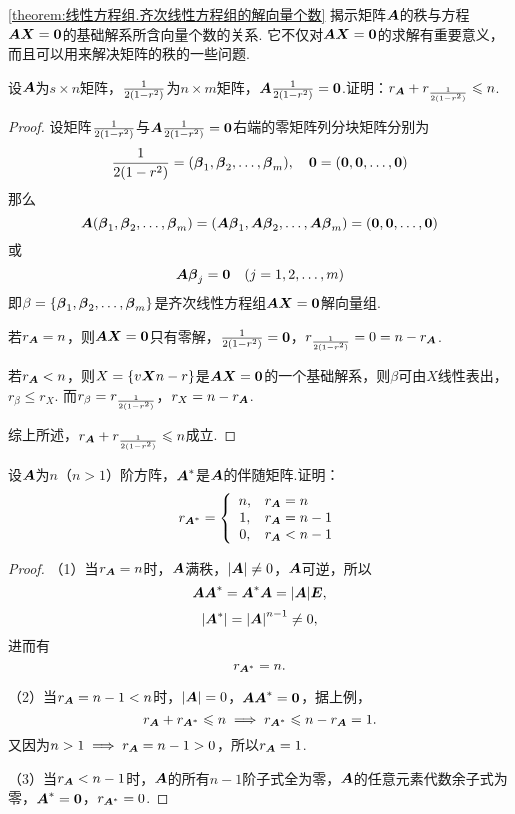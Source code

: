 \cref{theorem:线性方程组.齐次线性方程组的解向量个数} 揭示矩阵\(\A\)的秩与方程\(\A\x=\z\)的基础解系所含向量个数的关系.
它不仅对\(\A\x=\z\)的求解有重要意义，而且可以用来解决矩阵的秩的一些问题.
\begin{example}
设\(\A\)为\(s \times n\)矩阵，\(\B\)为\(n \times m\)矩阵，\(\A\B=\z\).证明：\(r_{\A} + r_{\B} \leqslant n\).
\begin{proof}
\def\b#1{\mat{\beta}_{#1}}
设矩阵\(\B\)与\(\A\B=\z\)右端的零矩阵列分块矩阵分别为\[
\B=(\b1,\b2,\dotsc,\b m),
\quad
\z=(\z,\z,\dotsc,\z)
\]那么\[
\A(\b1,\b2,\dotsc,\b m) = (\A\b1,\A\b2,\dotsc,\A\b m) = (\z,\z,\dotsc,\z)
\]或\[
\A\b j = \z \quad (j=1,2,\dotsc,m)
\]即\(\beta=\{\b1,\b2,\dotsc,\b m\}\)是齐次线性方程组\(\A\mat{X}=\z\)解向量组.

若\(r_{\A}=n\)，则\(\A\mat{X}=\z\)只有零解，\(\B=\z\)，\(r_{\B}=0=n-r_{\A}\).

若\(r_{\A}<n\)，则\(X=\{\v{\x}{n-r}\}\)是\(\A\mat{X}=\z\)的一个基础解系，则\(\beta\)可由\(X\)线性表出，\(r_{\beta} \leqslant r_{X}\).
而\(r_{\beta}=r_{\B}\)，\(r_{X}=n-r_{\A}\).

综上所述，\(r_{\A}+r_{\B} \leqslant n\)成立.
\end{proof}
\end{example}

\begin{example}
设\(\A\)为\(n\)（\(n>1\)）阶方阵，\(\A^*\)是\(\A\)的伴随矩阵.证明：\[
r_{\A^*} = \left\{ \begin{array}{cl}
n, & r_{\A}=n \\
1, & r_{\A}=n-1 \\
0, & r_{\A}<n-1
\end{array} \right.
\]
\begin{proof}
（1）当\(r_{\A} = n\)时，\(\A\)满秩，\(\abs{\A} \neq 0\)，\(\A\)可逆，所以\[
\A \A^* = \A^* \A = \abs{\A} \E,
\]\[
\abs{\A^*} = \abs{\A}^{n-1} \neq 0,
\]进而有\[
r_{\A^*} = n.
\]

（2）当\(r_{\A} = n-1 < n\)时，\(\abs{\A} = 0\)，\(\A \A^* = \z\)，据上例，\[
r_{\A} + r_{\A^*} \leqslant n
\implies
r_{\A^*} \leqslant n - r_{\A} = 1.
\]又因为\(n > 1 \implies r_{\A} = n-1 > 0\)，所以\(r_{\A} = 1\).

（3）当\(r_{\A} < n-1\)时，\(\A\)的所有\(n-1\)阶子式全为零，\(\A\)的任意元素代数余子式为零，\(\A^* = \z\)，\(r_{\A^*} = 0\).
\end{proof}
\end{example}


